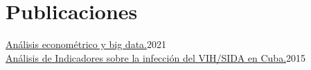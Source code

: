 \documentclass{muratcan_cv}
\begin{document}
\section{Publicaciones}
\datedexperience
{\href{https://www.funcas.es/wp-content/uploads/2021/06/An\%C3\%A1lisis-econom\%C3\%A9trico-y-big-data.pdf}{Análisis econométrico y big data.}}{2021} \\
%
\datedexperience
{\href{https://1library.co/document/y4x1l85z-encuesta-indicadores-prevencion-infeccion-vih-sida.html}{Análisis de Indicadores sobre la infección del VIH/SIDA en Cuba.}}{2015} 

\end{document}
